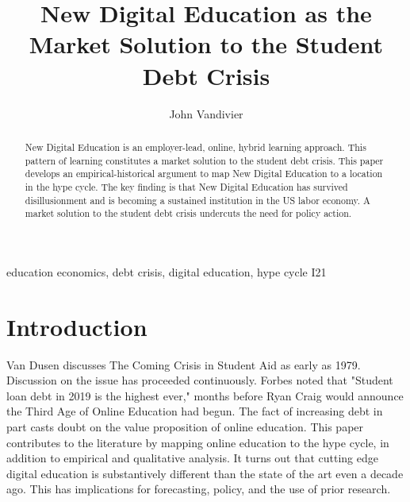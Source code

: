 \documentclass[review]{elsarticle}
\begin{document}
\begin{frontmatter}

\title{
    New Digital Education as the Market Solution to the Student Debt Crisis
}


\author[mymainaddress]{John Vandivier}
\address[mymainaddress]{4400 University Dr, Fairfax, VA 22030}

\begin{abstract}
    New Digital Education is an employer-lead, online, hybrid learning approach.
    This pattern of learning constitutes a market solution to the student debt crisis.
    This paper develops an empirical-historical argument to map New Digital Education
    to a location in the hype cycle. The key finding is that New Digital Education
    has survived disillusionment and is becoming a sustained institution in the US labor economy.
    A market solution to the student debt crisis undercuts the need for policy action.
\end{abstract}

\begin{keyword}
education economics, debt crisis, digital education, hype cycle
\MSC[2010] I21 %
\end{keyword}

\end{frontmatter}

\pagebreak
\linenumbers
        
    \section{Introduction}

    Van Dusen discusses The Coming Crisis in Student Aid as early as 1979\cite{van1979coming}.
    Discussion on the issue has proceeded continuously.
    Forbes\cite{friedman2019student} noted that "Student loan debt in 2019 is the highest ever,"
    months before Ryan Craig would announce the Third Age of Online Education had begun\cite{craig2019welcome}.
    The fact of increasing debt in part casts doubt on the value proposition of online education.
    This paper contributes to the literature by mapping online education to the hype cycle, in addition to empirical and qualitative analysis.
    It turns out that cutting edge digital education is substantively different than the state of the art even a decade ago.
    This has implications for forecasting, policy, and the use of prior research.
\end{document}
